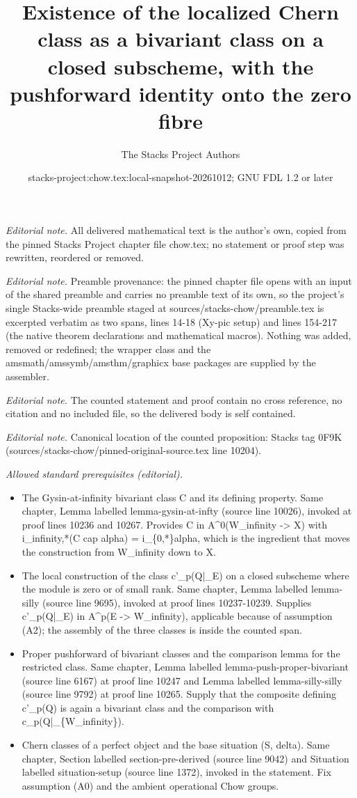 \documentclass[10pt,a4paper]{amsart}
\title{Existence of the localized Chern class as a bivariant class on a closed subscheme, with the pushforward identity onto the zero fibre}
\author{The Stacks Project Authors}
\date{stacks-project:chow.tex:local-snapshot-20261012; GNU FDL 1.2 or later}
\theoremstyle{plain}
\theoremstyle{definition}
\theoremstyle{remark}
\numberwithin{equation}{subsection}
\begin{document}
\maketitle
\noindent\textit{Editorial note.} All delivered mathematical text is the author's own, copied from the pinned Stacks Project chapter file chow.tex; no statement or proof step was rewritten, reordered or removed.\par\medskip
\noindent\textit{Editorial note.} Preamble provenance: the pinned chapter file opens with an input of the shared preamble and carries no preamble text of its own, so the project's single Stacks-wide preamble staged at sources/stacks-chow/preamble.tex is excerpted verbatim as two spans, lines 14-18 (Xy-pic setup) and lines 154-217 (the native theorem declarations and mathematical macros). Nothing was added, removed or redefined; the wrapper class and the amsmath/amssymb/amsthm/graphicx base packages are supplied by the assembler.\par\medskip
\noindent\textit{Editorial note.} The counted statement and proof contain no cross reference, no citation and no included file, so the delivered body is self contained.\par\medskip
\noindent\textit{Editorial note.} Canonical location of the counted proposition: Stacks tag 0F9K (sources/stacks-chow/pinned-original-source.tex line 10204).\par\medskip
\noindent\textit{Allowed standard prerequisites (editorial).}\begin{itemize}
\item The Gysin-at-infinity bivariant class C and its defining property. Same chapter, Lemma labelled lemma-gysin-at-infty (source line 10026), invoked at proof lines 10236 and 10267. Provides C in A\textasciicircum{}0(W\_infinity -> X) with i\_infinity,*(C cap alpha) = i\_\{0,*\}alpha, which is the ingredient that moves the construction from W\_infinity down to X.
\item The local construction of the class c'\_p(Q|\_E) on a closed subscheme where the module is zero or of small rank. Same chapter, Lemma labelled lemma-silly (source line 9695), invoked at proof lines 10237-10239. Supplies c'\_p(Q|\_E) in A\textasciicircum{}p(E -> W\_infinity), applicable because of assumption (A2); the assembly of the three classes is inside the counted span.
\item Proper pushforward of bivariant classes and the comparison lemma for the restricted class. Same chapter, Lemma labelled lemma-push-proper-bivariant (source line 6167) at proof line 10247 and Lemma labelled lemma-silly-silly (source line 9792) at proof line 10265. Supply that the composite defining c'\_p(Q) is again a bivariant class and the comparison with c\_p(Q|\_\{W\_infinity\}).
\item Chern classes of a perfect object and the base situation (S, delta). Same chapter, Section labelled section-pre-derived (source line 9042) and Situation labelled situation-setup (source line 1372), invoked in the statement. Fix assumption (A0) and the ambient operational Chow groups.
\end{itemize}\medskip
\end{document}

